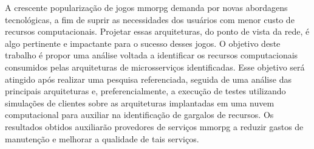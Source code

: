 A crescente popularização de jogos \acf{mmorpg} demanda por novas abordagens tecnológicas, a fim de suprir as necessidades dos usuários com menor custo de recursos computacionais.
%
Projetar essas arquiteturas, do ponto de vista da rede, é algo pertinente e impactante para o sucesso desses jogos.
%
O objetivo deste trabalho é propor uma análise voltada a identificar os recursos computacionais consumidos pelas arquiteturas de microsserviços identificadas.
%
Esse objetivo será atingido após realizar uma pesquisa referenciada, seguida de uma análise das principais arquiteturas e, preferencialmente, a execução de testes utilizando simulações de clientes sobre as arquiteturas implantadas em uma nuvem computacional para auxiliar na identificação de gargalos de recursos. 
%
Os resultados obtidos auxiliarão provedores de serviços \ac{mmorpg} a reduzir gastos de manutenção e melhorar a qualidade de tais serviços.
